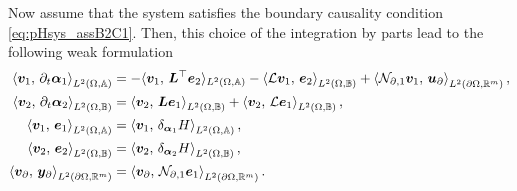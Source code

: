 Now assume that the system satisfies the boundary causality condition \ref{eq:pHsys_assB2C1}. Then, this choice of the integration by parts lead to the following weak formulation
\begin{equation}\label{eq:weak_sys_intJ1}
\begin{aligned}
\inner[L^2(\Omega, \mathbb{A})]{\bm{v}_1}{\partial_t \bm{\alpha}_1} &=   -  \langle{\bm{v}_1}, \,{\bm{L}^\top \bm{e}_2}\rangle_{L^2(\Omega, \mathbb{A})}  -\inner[L^2(\Omega, \mathbb{B})]{\mathcal{L}\bm{v}_1}{\bm{e}_2} + \inner[L^2(\partial \Omega, \mathbb{R}^m)]{\mathcal{N}_{\partial, 1} \bm{v}_1}{\bm{u}_\partial}, \\
\inner[L^2(\Omega, \mathbb{B})]{\bm{v}_2}{\partial_t \bm{\alpha}_2} &=   \inner[L^2(\Omega, \mathbb{B})]{\bm{v}_2}{\bm{L}\bm{e}_1} + \inner[L^2(\Omega, \mathbb{B})]{\bm{v}_2}{\mathcal{L}\bm{e}_1}, \\
\inner[L^2(\Omega, \mathbb{A})]{\bm{v}_1}{\bm{e}_1}&= \inner[L^2(\Omega, \mathbb{A})]{\bm{v}_1}{\delta_{\bm{\alpha}_1} H}, \\
\inner[L^2(\Omega, \mathbb{B})]{\bm{v}_2}{\bm{e}_2}&= \inner[L^2(\Omega, \mathbb{B})]{\bm{v}_2}{\delta_{\bm{\alpha}_2} H}, \\
\inner[L^2(\partial \Omega, \mathbb{R}^m)]{\bm{v}_\partial}{\bm{y}_\partial} &= \inner[L^2(\partial \Omega, \mathbb{R}^m)]{\bm{v}_\partial}{\mathcal{N}_{\partial, 1}\bm{e}_1}.
\end{aligned}
\end{equation}

